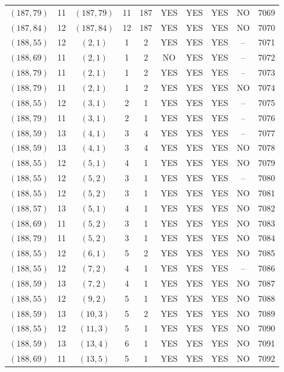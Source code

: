 \begin{longtable}{|c|c|c|c|c|c|c|c|c|c|}
$(187, 79)$ & 11 & $(187, 79)$ & 11 & 187 & YES & YES & YES & NO & 7069\\
$(187, 84)$ & 12 & $(187, 84)$ & 12 & 187 & YES & YES & YES & NO & 7070\\
$(188, 55)$ & 12 & $(2, 1)$ & 1 & 2 & YES & YES & YES & -- & 7071\\
$(188, 69)$ & 11 & $(2, 1)$ & 1 & 2 & NO & YES & YES & -- & 7072\\
$(188, 79)$ & 11 & $(2, 1)$ & 1 & 2 & YES & YES & YES & -- & 7073\\
$(188, 79)$ & 11 & $(2, 1)$ & 1 & 2 & YES & YES & YES & NO & 7074\\
$(188, 55)$ & 12 & $(3, 1)$ & 2 & 1 & YES & YES & YES & -- & 7075\\
$(188, 79)$ & 11 & $(3, 1)$ & 2 & 1 & YES & YES & YES & -- & 7076\\
$(188, 59)$ & 13 & $(4, 1)$ & 3 & 4 & YES & YES & YES & -- & 7077\\
$(188, 59)$ & 13 & $(4, 1)$ & 3 & 4 & YES & YES & YES & NO & 7078\\
$(188, 55)$ & 12 & $(5, 1)$ & 4 & 1 & YES & YES & YES & NO & 7079\\
$(188, 55)$ & 12 & $(5, 2)$ & 3 & 1 & YES & YES & YES & -- & 7080\\
$(188, 55)$ & 12 & $(5, 2)$ & 3 & 1 & YES & YES & YES & NO & 7081\\
$(188, 57)$ & 13 & $(5, 1)$ & 4 & 1 & YES & YES & YES & NO & 7082\\
$(188, 69)$ & 11 & $(5, 2)$ & 3 & 1 & YES & YES & YES & NO & 7083\\
$(188, 79)$ & 11 & $(5, 2)$ & 3 & 1 & YES & YES & YES & NO & 7084\\
$(188, 55)$ & 12 & $(6, 1)$ & 5 & 2 & YES & YES & YES & NO & 7085\\
$(188, 55)$ & 12 & $(7, 2)$ & 4 & 1 & YES & YES & YES & -- & 7086\\
$(188, 59)$ & 13 & $(7, 2)$ & 4 & 1 & YES & YES & YES & NO & 7087\\
$(188, 55)$ & 12 & $(9, 2)$ & 5 & 1 & YES & YES & YES & NO & 7088\\
$(188, 59)$ & 13 & $(10, 3)$ & 5 & 2 & YES & YES & YES & NO & 7089\\
$(188, 55)$ & 12 & $(11, 3)$ & 5 & 1 & YES & YES & YES & NO & 7090\\
$(188, 59)$ & 13 & $(13, 4)$ & 6 & 1 & YES & YES & YES & NO & 7091\\
$(188, 69)$ & 11 & $(13, 5)$ & 5 & 1 & YES & YES & YES & NO & 7092\\

\end{longtable}
